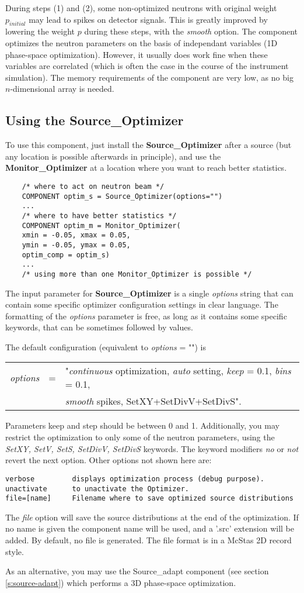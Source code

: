 During steps (1) and (2), some non-optimized neutrons with original
weight $p_{initial}$ may lead to spikes on detector signals. This is
greatly improved by lowering the weight $p$ during these steps, with the
{\it smooth} option.
The component optimizes the neutron parameters on the basis of
independant variables (1D phase-space optimization). However, it usually does work fine when these
variables are correlated (which is often the case in the course of the
instrument simulation).
The memory requirements of the component are very low, as no big
$n$-dimensional array is needed.

\subsection{Using the Source\_Optimizer}

To use this component, just install the {\bf Source\_Optimizer} after a
source (but any location is possible afterwards in principle), and use the {\bf
  Monitor\_Optimizer} at a location where you want to reach better
statistics.

\begin{lstlisting}
    /* where to act on neutron beam */
    COMPONENT optim_s = Source_Optimizer(options="")
    ...
    /* where to have better statistics */
    COMPONENT optim_m = Monitor_Optimizer(
    xmin = -0.05, xmax = 0.05,
    ymin = -0.05, ymax = 0.05,
    optim_comp = optim_s)
    ...
    /* using more than one Monitor_Optimizer is possible */
\end{lstlisting}

The input parameter for {\bf Source\_Optimizer} is a single {\it
  options} string that can contain some specific optimizer configuration
settings in clear language. The formatting of the {\it options}
parameter is free, as long as it contains some specific keywords, that
can be sometimes followed by values.

The default configuration (equivalent to {\it options} = "") is
\begin{center}
\begin{tabular}{rcl}
  {\it options} & = & "{\it continuous} optimization,
  {\it auto} setting, {\it keep} = 0.1, {\it bins} = 0.1, \\
  & & {\it smooth} spikes, SetXY+SetDivV+SetDivS".
\end{tabular}
\end{center}
Parameters keep and step should be between 0 and 1.
Additionally, you may restrict the optimization to only some of the neutron parameters, using the {\it SetXY, SetV, SetS, SetDivV, SetDivS} keywords.
The keyword modifiers {\it no} or {\it not} revert the next option.
Other options not shown here are:
\begin{lstlisting}
verbose         displays optimization process (debug purpose).
unactivate      to unactivate the Optimizer.
file=[name]     Filename where to save optimized source distributions
\end{lstlisting}
The {\it file} option will save the source distributions at the end of
the optimization. If no name is given the component name will be used,
and a '.src' extension will be added. By default, no file is generated.
The file format is in a McStas 2D record style.

As an alternative, you may use the Source\_adapt component
(see section \ref{s:source-adapt}) which performs
a 3D phase-space optimization.
